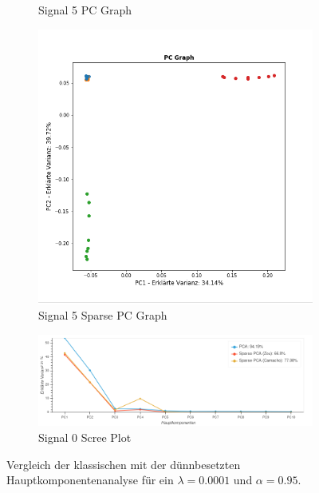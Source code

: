 \begin{figure}
\begin{subfigure}{0.45\textwidth}
\caption{Signal 5 PC Graph}
\end{subfigure}
%
\begin{subfigure}{0.45\textwidth}
\includegraphics[width = \textwidth]{figures/Signal_0_sparse_pc_graph.png}
\caption{Signal 5 Sparse PC Graph}
\end{subfigure}
%
\begin{subfigure}{0.9\textwidth}
\includegraphics[width = \textwidth]{figures/Signal_0_scree_plot_10.png}
\caption{Signal 0 Scree Plot}
\end{subfigure}
\caption{Vergleich der klassischen mit der dünnbesetzten Hauptkomponentenanalyse für ein $\lambda=0.0001$ und $\alpha = 0.95$.}
\end{figure}

